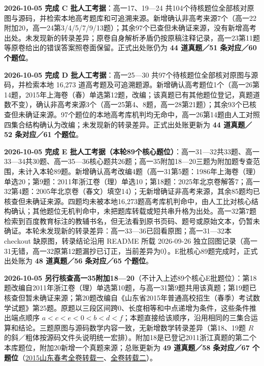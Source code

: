 \documentclass[a4paper,11pt]{article}
\begin{document}
\textbf{2026-10-05 完成 C 批人工考据}：高一17、19---24 共104个待核题位全部核对原图与源码，并检索本地高考题库和可追溯来源。新增确认非高考来源7个（高一22附加20，高一24第3/4/5/7/9/13题）；其余97个已查但未确证来源，没有新增高考出处。未发现新的转录差异；原卷自身解析矛盾仍按原稿注释记录，高一23第11题等原卷给出的错误答案照卷面保留。正式出处账仍为 \textbf{44 道真题／51 条对应／60 个题位}。

\textbf{2026-10-05 完成 D 批人工考据}：高一25---30 共97个待核题位全部核对原图与源码，并检索本地 16,273 道高考题及可追溯题源。新增确认高考题位1个（高一26第14题，2015年上海卷（春）单选第12题，改编；该真题已有其他题位登记，真题道数不变），确认非高考来源3个（高一25第4、8题，高一28第21题）；其余93个已核查但未确证来源。97个题位的本地高考库机判均无命中，高一26第14题由人工对照四集合结构确认为改编；未发现新的转录差异。正式出处账更新为 \textbf{44 道真题／52 条对应／61 个题位}。

\textbf{2026-10-05 完成 E 批人工考据（本轮89个核心题位）}：高一31---32共33题、高一33---34共30题、高一35---36核心题共26题；高一35附加18---20三题为附加题专查范围，未计入本轮89题。新增确认高考改编4题（高一31第5题：1986年上海卷（理）单选20；第9题：2011年浙江卷（理）单选10；第18题：2025年北京卷解答7；高一32第4题：2005年北京卷（春文）填空14）；无新增确证非高考来源，其余85题均已核查但未确证来源。四题均未被本地16,273题高考库机判命中，由人工比对核心结构确认；其他题位无机判命中，未把题库转载或短共串升格为出处。高一32第7题检索到百度教育标注的教辅书名，但无法看到原书页码、题号或原始文本，仍暂未确证。本轮未发现新的转录差异：高一33---36已回看原图；高一31---32本 checkout 缺原图，转录结论沿用 README 所载 2026-09-26 独立回图记录（高一31无错，高一32原第12题漏抄已订正，当前差异为0）。E批核心89题完成时，正式出处账为 \textbf{48 道真题／56 条对应／65 个题位}。

\textbf{2026-10-05 另行核查高一35附加18---20}（不计入上述89个核心E批题位）：第18题改编自2011年浙江卷（理）单选第10题，与高一31第9题共用该真题；第19题已核查但暂未确证来源；第20题改编自《山东省2015年普通高校招生（春季）考试数学试题》第25题。原题以三段区间跨0、长度相等和中点递增为条件，这些条件推出端点顺序 \(a<c<e<0<b<d<f\)；本题直接给该顺序，沿用相同的三集合运算和结论。三题原图与源码数学内容一致，无新增数学转录差异（第18、19题 \(R\) 的斜／粗体按源码文件头说明统一宏排）。附加18是已登记2011浙江真题的第二个本库题位，附加20新增一个真题来源；总账更新为 \textbf{49 道真题／58 条对应／67 个题位}（\href{https://wenku.baidu.com/view/ae24a5fed6bbfd0a79563c1ec5da50e2534dd14e.html}{2015山东春考全卷转载一}、\href{https://wenku.baidu.com/view/eec989a467ce0508763231126edb6f1aff007192.html}{全卷转载二}）。
\end{document}
